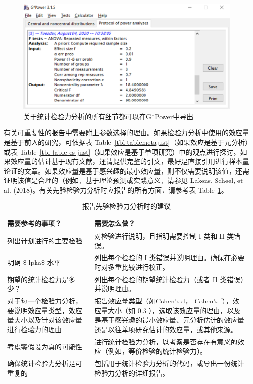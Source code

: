 \documentclass[
  letterpaper,
  DIV=11,
  numbers=noendperiod]{scrreprt}
\begin{document}
\begin{figure}

{\centering \includegraphics[width=1\textwidth,height=\textheight]{images/gpowprotocol.png}

}

\caption{\label{fig-gpowprotocol}关于统计检验力分析的所有细节都可以在G*Power中导出}

\end{figure}

有关可重复性的报告中需要附上参数选择的理由。如果检验力分析中使用的效应量是基于前人的研究，可依据表
Table~\ref{tbl-tablemetajust}（如果效应是基于元分析）或表
Table~\ref{tbl-table-es-just}（如果效应是基于单项研究）中的观点进行探讨。如果效应量的估计基于现有文献，还请提供完整的引文，最好是直接引用进行样本量论证的文章。如果效应量是基于感兴趣的最小效应量，则不仅需要说明该值，还需证明该值是合理的（例如，基于理论预测或实践意义，请参见
Lakens, Scheel, et al.
(2018)。有关先验检验力分析时应报告的所有方面，请参考表
Table~\ref{tbl-table-pow-rec-2}。

\hypertarget{tbl-table-pow-rec-2}{}
\begin{table}
\caption{\label{tbl-table-pow-rec-2}报告先验检验力分析时的建议 }\tabularnewline

\centering
\begin{tabular}{>{\raggedright\arraybackslash}p{5cm}|>{\raggedright\arraybackslash}p{10cm}}
\hline
需要参考的事项？ & 需要怎么做？\\
\hline
列出计划进行的主要检验 & 对检验进行说明，且指明需要控制 I 类和 II 类错误。\\
\hline
明确 \$lpha\$ 水平 & 列出每个检验的 I 类错误并说明理由。确保在必要时对多重比较进行校正。\\
\hline
期望的统计检验力是多少？ & 列出每个检验的期望统计检验力（或者 II 类错误）并说明理由。\\
\hline
对于每一个检验力分析，要说明效应量类型，效应量大小以及针对该效应量进行检验力的理由 & 报告效应量类型（如Cohen's d， Cohen's f），效应量大小（如 0.3 ），选取该效应量的理由，以及是基于感兴趣的最小效应量、元分析估计的效应量还是以往单项研究估计的效应量，或其他来源。\\
\hline
考虑零假设为真的可能性 & 进行统计检验力分析，以考察是否存在有意义的效应（例如，等价检验的统计检验力）。\\
\hline
确保统计检验力分析是可重复的 & 包括用于统计检验力分析的代码，或导出一份统计检验力分析的详细报告。\\
\hline
\end{tabular}
\end{table}
\end{document}
